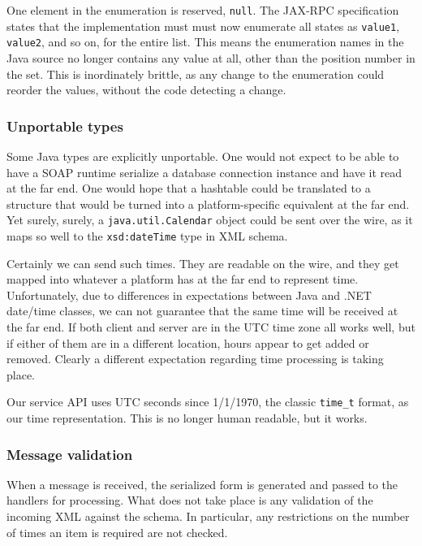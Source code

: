 One element in the enumeration is reserved, \verb|null|. The JAX-RPC
specification states that the implementation must must now enumerate all
states as \verb|value1|, \verb|value2|, and so on, for the entire list.
This means the enumeration names in the Java source no longer contains
any value at all, other than the position number in the set. This is
inordinately brittle, as any change to the enumeration could reorder the
values, without the code detecting a change.


\subsubsection{Unportable types}
\label{objections:o-x:types}

Some Java types are explicitly unportable. One would not expect to be
able to have a SOAP runtime serialize a database connection instance and
have it read at the far end. One would hope that a hashtable could be
translated to a structure that would be turned into a platform-specific
equivalent at the far end. Yet surely, surely, a \verb|java.util.Calendar|
object could be sent over the wire, as it maps so well to the
\verb|xsd:dateTime| type in XML schema.

Certainly we can send such times. They are readable on the wire, and
they get mapped into whatever a platform has at the far end to represent
time. Unfortunately, due to differences in expectations between Java and
.NET date/time classes, we can not guarantee that the same time will be
received at the far end. If both client and server are in the UTC time
zone all works well, but if either of them are in a different location,
hours appear to get added or removed. Clearly a different expectation
regarding time processing is taking place. 

Our service API uses UTC seconds since 1/1/1970, the classic \verb|time_t|
format, as our time representation. This is no longer human readable,
but it works. 

\subsubsection{Message validation}
\label{objections:o-x:validation}


When a message is received, the serialized form is generated and passed
to the handlers for processing. What does not take place is any
validation of the incoming XML against the schema. In particular, any
restrictions on the number of times an item is required are not checked.

